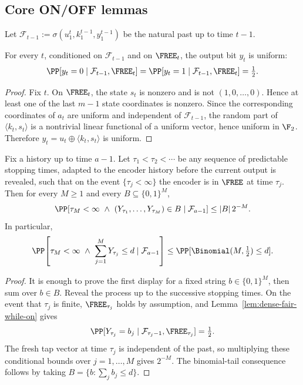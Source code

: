 \subsection{Core ON/OFF lemmas}
\label{subsec:inner-dense-onoff}

Let $\mathcal{F}_{t-1}:=\sigma(u_1^t,k_1^{t-1},y_1^{t-1})$ be the natural past up to time $t-1$.

\begin{lemma}
\label{lem:dense-fair-while-on}
For every $t$, conditioned on $\mathcal{F}_{t-1}$ and on $\FREE_t$, the output bit $y_t$ is uniform:
\[
\PP[y_t=0\mid \mathcal{F}_{t-1},\FREE_t]=\PP[y_t=1\mid \mathcal{F}_{t-1},\FREE_t]=\tfrac12.
\]
\end{lemma}

\begin{proof}
Fix $t$. On $\FREE_t$, the state \(s_t\) is nonzero and is not \((1,0,\dots,0)\). Hence at least one of the last
\(m-1\) state coordinates is nonzero. Since the corresponding coordinates of \(a_t\) are uniform and independent of
\(\mathcal{F}_{t-1}\), the random part of \(\langle k_t,s_t\rangle\) is a nontrivial linear functional of a uniform
vector, hence uniform in \(\F_2\). Therefore \(y_t=u_t\oplus\langle k_t,s_t\rangle\) is uniform.
\end{proof}

\begin{lemma}
\label{lem:dense-on-time-domination}
Fix a history up to time \(a-1\). Let
\(\tau_1<\tau_2<\cdots\) be any sequence of predictable stopping times, adapted to the encoder history before the
current output is revealed, such that on the event \(\{\tau_j<\infty\}\) the encoder is in \(\FREE\) at time
\(\tau_j\). Then
for every \(M\ge 1\) and every \(B\subseteq\{0,1\}^M\),
\[
\PP\!\left[
\tau_M<\infty\ \wedge\ (Y_{\tau_1},\dots,Y_{\tau_M})\in B
\mid \mathcal{F}_{a-1}
\right]
\le
|B|\,2^{-M}.
\]
In particular,
\[
\PP\!\left[
\tau_M<\infty\ \wedge\ \sum_{j=1}^M Y_{\tau_j}\le d
\mid \mathcal{F}_{a-1}
\right]
\le
\PP[\Binomial(M,\tfrac12)\le d].
\]
\end{lemma}

\begin{proof}
It is enough to prove the first display for a fixed string \(b\in\{0,1\}^M\), then sum over \(b\in B\).
Reveal the process up to the successive stopping times. On the event that \(\tau_j\) is finite, \(\FREE_{\tau_j}\)
holds by assumption, and Lemma~\ref{lem:dense-fair-while-on} gives
\[
\PP[Y_{\tau_j}=b_j\mid \mathcal{F}_{\tau_j-1},\FREE_{\tau_j}]=\tfrac12.
\]
The fresh tap vector at time \(\tau_j\) is independent of the past, so multiplying these conditional bounds over
\(j=1,\dots,M\) gives \(2^{-M}\). The binomial-tail consequence follows by taking
\(B=\{b:\sum_j b_j\le d\}\).
\end{proof}

